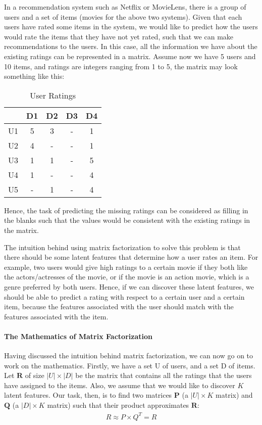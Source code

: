 In a recommendation system such as Netflix or MovieLens, there is a group of users and a set of items (movies for the above two systems). Given that each users have rated some items in the system, we would like to predict how the users would rate the items that they have not yet rated, such that we can make recommendations to the users. In this case, all the information we have about the existing ratings can be represented in a matrix. Assume now we have 5 users and 10 items, and ratings are integers ranging from 1 to 5, the matrix may look something like this:
\begin{table}[ht]
\caption{User Ratings}
\centering %
\begin{tabular}{c c c c c}
\hline\hline %
& D1 & D2 & D3 & D4 \\ [0.5ex] %
\hline %
U1 & 5 & 3 & - & 1\\ %
U2 & 4 & - & - & 1\\
U3 & 1 & 1 & - & 5\\
U4 & 1 & - & - & 4\\
U5 & - & 1 & - & 4\\ [1ex] %
\hline %
\end{tabular}
\end{table}

Hence, the task of predicting the missing ratings can be considered as filling in the blanks such that the values would be consistent with the existing ratings in the matrix.
 
The intuition behind using matrix factorization to solve this problem is that there should be some latent features that determine how a user rates an item. For example, two users would give high ratings to a certain movie if they both like the actors/actresses of the movie, or if the movie is an action movie, which is a genre preferred by both users. Hence, if we can discover these latent features, we should be able to predict a rating with respect to a certain user and a certain item, because the features associated with the user should match with the features associated with the item.
\paragraph{The Mathematics of Matrix Factorization}

Having discussed the intuition behind matrix factorization, we can now go on to work on the mathematics. Firstly, we have a set U of users, and a set D of items. Let $\mathbf{R}$ of size $|U| \times |D|$ be the matrix that contains all the ratings that the users have assigned to the items. Also, we assume that we would like to discover $K$ latent features. Our task, then, is to find two matrices $\mathbf{P}$ (a $|U| \times K$ matrix) and $\mathbf{Q}$ (a $|D| \times K$ matrix) such that their product approximates $\mathbf{R}$:
  \begin{gather*}
    R \approx P \times Q^{T} = \widehat{R}
  \end{gather*}

